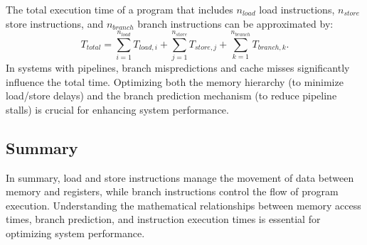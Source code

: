 The total execution time of a program that includes $n_{load}$ load instructions, $n_{store}$ store instructions, and $n_{branch}$ branch instructions can be approximated by:
\[
T_{total} = \sum_{i=1}^{n_{load}} T_{load,i} + \sum_{j=1}^{n_{store}} T_{store,j} + \sum_{k=1}^{n_{branch}} T_{branch,k}.
\]
In systems with pipelines, branch mispredictions and cache misses significantly influence the total time. Optimizing both the memory hierarchy (to minimize load/store delays) and the branch prediction mechanism (to reduce pipeline stalls) is crucial for enhancing system performance.

\subsection{Summary}

In summary, load and store instructions manage the movement of data between memory and registers, while branch instructions control the flow of program execution. Understanding the mathematical relationships between memory access times, branch prediction, and instruction execution times is essential for optimizing system performance.

